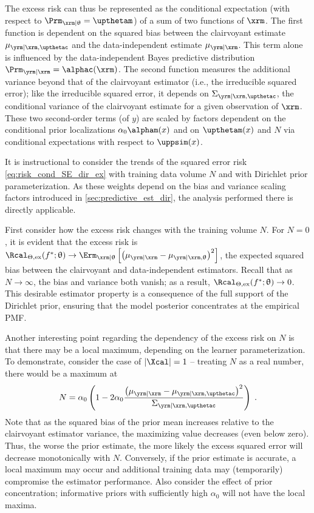 \documentclass[12pt]{report}
\newcommand{\todohi}[1]{\todo[inline,color=orange!50,linecolor=red]{#1}}
\begin{document}
The excess risk can thus be represented as the conditional expectation (with respect to $\Prm_{\xrm | \uptheta} = \upthetam$) of a sum of two functions of $\xrm$.  The first function is dependent on the squared bias between the clairvoyant estimate $\mu_{\yrm | \xrm,\upthetac}$ and the data-independent estimate $\mu_{\yrm | \xrm}$. This term alone is influenced by the data-independent Bayes predictive distribution $\Prm_{\yrm | \xrm} = \alphac(\xrm)$. The second function measures the additional variance beyond that of the clairvoyant estimator (i.e., the irreducible squared error); like the irreducible squared error, it depends on $\Sigma_{\yrm | \xrm,\upthetac}$, the conditional variance of the clairvoyant estimate for a given observation of $\xrm$. These two second-order terms (of $y$) are scaled by factors dependent on the conditional prior localizations $\alpha_0 \alpham(x)$ and on $\upthetam(x)$ and $N$ via conditional expectations with respect to $\uppsim(x)$.


It is instructional to consider the trends of the squared error risk \eqref{eq:risk_cond_SE_dir_ex} with training data volume $N$ and with Dirichlet prior parameterization. As these weights depend on the bias and variance scaling factors introduced in \cref{sec:predictive_est_dir}, the analysis performed there is directly applicable.


First consider how the excess risk changes with the training volume $N$. For $N=0$, it is evident that the excess risk is $\Rcal_{\Theta, \mathrm{ex}}(f^* ; \uptheta) \to \Erm_{\xrm | \uptheta}\left[ \left( \mu_{\yrm | \xrm} - \mu_{\yrm | \xrm,\uptheta} \right)^2 \right]$,  the expected squared bias between the clairvoyant and data-independent estimators. Recall that as $N \to \infty$, the bias and variance both vanish; as a result, $\Rcal_{\Theta, \mathrm{ex}}(f^* ; \uptheta) \to 0$. This desirable estimator property is a consequence of the full support of the Dirichlet prior, ensuring that the model posterior concentrates at the empirical PMF.

Another interesting point regarding the dependency of the excess risk on $N$ is that there may be a local maximum, depending on the learner parameterization. To demonstrate, consider the case of $|\Xcal| = 1$ -- treating $N$ as a real number, there would be a maximum at 
\begin{equation}
N = \alpha_0 \left( 1 - 2 \alpha_0 \frac{\left( \mu_{\yrm | \xrm} - \mu_{\yrm | \xrm,\upthetac} \right)^2}{\Sigma_{\yrm | \xrm,\upthetac}} \right) \;.
\end{equation}
\todohi{CHECK, consider x dependency + below}
Note that as the squared bias of the prior mean increases relative to the clairvoyant estimator variance, the maximizing value decreases (even below zero). Thus, the worse the prior estimate, the more likely the excess squared error will decrease monotonically with $N$. Conversely, if the prior estimate is accurate, a local maximum may occur and additional training data may (temporarily) compromise the estimator performance. Also consider the effect of prior concentration; informative priors with sufficiently high $\alpha_0$ will not have the local maxima.
\end{document}
